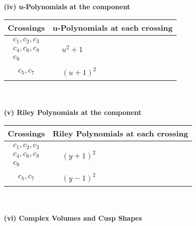 \documentclass[1p]{elsarticle_modified}
\theoremstyle{definition}
\begin{document}
\newpage\renewcommand{\arraystretch}{1}
\flushleft \textbf{(iv) u-Polynomials at the component}\newline \\
\begin{tabular}{m{50pt}|m{274pt}}
Crossings & \hspace{64pt}u-Polynomials at each crossing \\
\hline $$\begin{aligned}c_{1},c_{2},c_{3}\\c_{4},c_{6},c_{8}\\c_{9}\end{aligned}$$&$\begin{aligned}
&u^2+1
\end{aligned}$\\
\hline $$\begin{aligned}c_{5},c_{7}\end{aligned}$$&$\begin{aligned}
&(u+1)^2
\end{aligned}$\\
\hline
\end{tabular}\\~\\
\newpage\renewcommand{\arraystretch}{1}
\flushleft \textbf{(v) Riley Polynomials at the component}\newline \\
\begin{tabular}{m{50pt}|m{274pt}}
Crossings & \hspace{64pt}Riley Polynomials at each crossing \\
\hline $$\begin{aligned}c_{1},c_{2},c_{3}\\c_{4},c_{6},c_{8}\\c_{9}\end{aligned}$$&$\begin{aligned}
&(y+1)^2
\end{aligned}$\\
\hline $$\begin{aligned}c_{5},c_{7}\end{aligned}$$&$\begin{aligned}
&(y-1)^2
\end{aligned}$\\
\hline
\end{tabular}\\~\\
\newpage\flushleft \textbf{(vi) Complex Volumes and Cusp Shapes}
\end{document}
